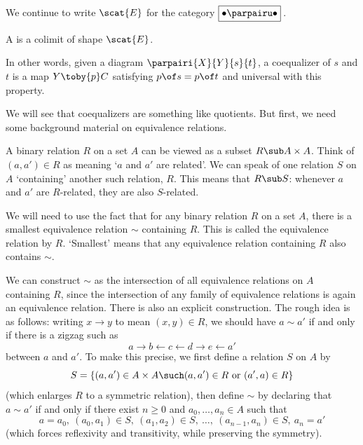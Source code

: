 

We continue to write $\scat{E}$ for the category $\fbox{$\bullet \parpairu
\bullet$}\,$. 

\begin{defn}
A %
%
%
is a colimit of shape $\scat{E}$.
\end{defn}

In other words, given a diagram $\parpairi{X}{Y}{s}{t}$, a coequalizer of
$s$ and $t$ is a map $Y \toby{p} C$ satisfying $p \of s = p \of t$ and
universal with this property.

We will see that coequalizers are something like quotients.  But first, we
need some background material on equivalence relations.

\begin{remarks}  
\label{rmks:gen-er}
A binary relation%
%
%
$R$ on a set $A$ can be viewed as a subset $R \sub A \times A$.  Think of
$(a, a') \in R$ as meaning `$a$ and $a'$ are related'.  We can speak of one
relation $S$ on $A$ `containing' another such relation, $R$.  This means
that $R \sub S$: whenever $a$ and $a'$ are $R$-related, they are also
$S$-related.

We will need to use the fact that for any binary relation $R$ on a set $A$,
there is a smallest equivalence relation $\sim$ containing $R$.  This is
called the equivalence relation %
%
%
%
by $R$.  `Smallest' means that any equivalence relation containing $R$ also
contains $\sim$.

We can construct $\sim$ as the intersection of all equivalence relations on
$A$ containing $R$, since the intersection of any family of equivalence
relations is again an equivalence relation.  There is also an explicit
construction.  The rough idea is as follows: writing $x \rightarrow y$ to
mean $(x, y) \in R$, we should have $a \sim a'$ if and only if there is a
zigzag such as
\[
a \rightarrow b \leftarrow c \leftarrow d \rightarrow e \leftarrow a'
\]
between $a$ and $a'$.  To make this precise, we first define a relation $S$
on $A$ by
\[
S = 
\{
(a, a') \in A \times A
\such
(a, a') \in R \text{ or } (a', a) \in R
\}
\]
(which enlarges $R$ to a symmetric relation), then define $\sim$ by
declaring that $a \sim a'$ if and only if there exist $n \geq 0$ and $a_0,
\ldots, a_n \in A$ such that
\[
a = a_0, 
\ 
(a_0, a_1) \in S,
\
(a_1, a_2) \in S,
\ 
\ldots,
\ 
(a_{n - 1}, a_n) \in S,
\ 
a_n = a'
\]
(which forces reflexivity and transitivity, while preserving the symmetry). 


\end{remarks}

